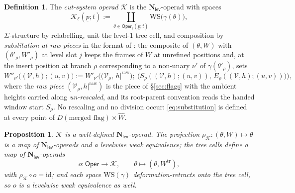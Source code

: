 \documentclass[12pt]{amsart}
\newtheorem{proposition}[subsection]{Proposition}
\theoremstyle{definition}
\newtheorem{definition}[subsection]{Definition}
\theoremstyle{remark}
\newcommand{\Oper}{\mathsf{Oper}}
\newcommand{\id}{\mathrm{id}}
\newcommand{\Cal}[1]{\mathcal{#1}}
\newcommand{\Nl}{\mathbf{N}_{\mathsf{lev}}}
\newcommand{\Kop}{\mathcal{K}}                   %
\newcommand{\Dg}[1]{D(#1)}                       %
\begin{document}
\begin{definition}\label{def:K}
The \emph{cut-system operad} $\Kop$ is the $\Nl$-operad with spaces
\[ \Kop_\ell(\underline{p}; t) := \coprod_{\theta\in \Oper_\ell(\underline{p};t)} \mathrm{WS}\big(\gamma(\theta)\big),\]
$\Sigma$-structure by relabelling, unit the level-$1$ tree cell, and composition by \emph{substitution at raw pieces} in the format of \cite[\S 6]{Clark-1}: the composite of $(\theta, W)$ with $(\theta'_\rho, W'_\rho)$ at level slot $j$ keeps the frames of $W$ at unrefined positions and, at the insert position at branch $\rho$ corresponding to a non-unary $\nu'$ of $\gamma(\theta'_\rho)$, sets
\begin{equation}\label{eq:substitution}
    W''_{\nu'}\big((\Cal{V},h);(u,v)\big) := W'_{\nu'}\Big( \big(\Cal{V}_\rho,\, h|^{\mathrm{raw}}\big);\ \big(S_\rho((\Cal{V},h);(u,v)),\, E_\rho((\Cal{V},h);(u,v))\big)\Big),
\end{equation}
where the \emph{raw piece} $(\Cal{V}_\rho, h|^{\mathrm{raw}})$ is the piece of \S\ref{sec:flags} with the ambient heights carried along \emph{un-rescaled}, and its root-parent convention reads the handed window start $S_\rho$. No rescaling and no division occur: \eqref{eq:substitution} is defined at every point of $\Dg{\text{merged flag}}\times\widehat{W}$.
\end{definition}

\begin{proposition}\label{prop:K-operad}
$\Kop$ is a well-defined $\Nl$-operad. The projection $\rho_{\Kop}\colon (\theta, W)\mapsto\theta$ is a map of $\Nl$-operads and a levelwise weak equivalence; the tree cells define a map of $\Nl$-operads
\[ o\colon \Oper\longrightarrow \Kop, \quad\quad \theta\mapsto (\theta, W^{\mathrm{tr}}),\]
with $\rho_{\Kop}\circ o = \id$; and each space $\mathrm{WS}(\gamma)$ deformation-retracts onto the tree cell, so $o$ is a levelwise weak equivalence as well.
\end{proposition}
\end{document}
